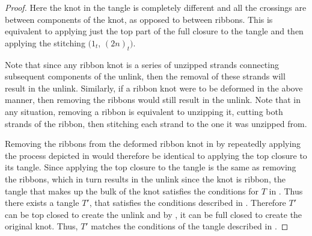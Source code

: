 \begin{paper}
\begin{proof}

Here the knot in the tangle is completely different and all the crossings are
between components of the knot, as opposed to between ribbons.
This is equivalent to applying just the top part of the full closure to the
tangle and then applying the stitching $(1_t$, $(2n)_t)$.


Note that since any ribbon knot is a series of unzipped strands connecting
subsequent components of the unlink, then the removal of these strands will
result in the unlink.
Similarly, if a ribbon knot were to be deformed in the above manner, then
removing the ribbons would still result in the unlink.
Note that in any situation, removing a ribbon is equivalent to unzipping
it, cutting both strands of the ribbon, then stitching each strand to the one it
was unzipped from.


Removing the ribbons from the deformed ribbon knot in \figTwisted by repeatedly
applying the process depicted in \figCut would therefore be identical to
applying the top closure to its tangle.
Since applying the top closure to the tangle is the same as removing the
ribbons, which in turn results in the unlink since the knot is ribbon, the
tangle that makes up the bulk of the knot satisfies the conditions for $T$ in
\lemTangles.
Thus there exists a tangle $T'$, that satisfies the conditions described in
\lemTangles.
Therefore $T'$ can be top closed to create the unlink and by \figComplete, it
can be full closed to create the original knot.
Thus, $T'$ matches the conditions of the tangle described in \thmRibbon.
\end{proof}


\end{paper}
